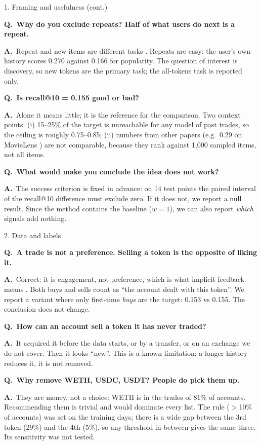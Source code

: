 \documentclass[aspectratio=169,10pt]{beamer}
\newcommand{\Q}[1]{\par{\color{orange}\bfseries Q.\ #1}\par\smallskip}
\newcommand{\A}{{\color{teal}\bfseries A.}\ }
\newcommand{\toindex}{\hfill\hyperlink{index}{\beamerreturnbutton{index}}}
\newcommand{\qsep}{\par\medskip{\color{grey!40}\hrule}\medskip}
\begin{document}
\begin{frame}{1. Framing and usefulness (cont.) \toindex}
  \footnotesize
  \Q{Why do you exclude repeats? Half of what users do next is a repeat.}
  \A Repeat and new items are different tasks \cite{li2021}. Repeats are easy: the user's own history scores 0.270 against 0.166 for popularity. The question of interest is discovery, so new tokens are the primary task; the all-tokens task is reported only.
  \qsep
  \Q{Is recall@10 = 0.155 good or bad?}
  \A Alone it means little; it is the reference for the comparison. Two context points: (i) 15--25\% of the target is unreachable for any model of past trades, so the ceiling is roughly 0.75--0.85; (ii) numbers from other papers (e.g.\ 0.29 on MovieLens \cite{cremonesi2010}) are not comparable, because they rank against 1{,}000 sampled items, not all items.
  \qsep
  \Q{What would make you conclude the idea does not work?}
  \A The success criterion is fixed in advance: on 14 test points the paired interval of the recall@10 difference must exclude zero. If it does not, we report a null result. Since the method contains the baseline ($w=1$), we can also report \emph{which} signals add nothing.
\end{frame}

\begin{frame}[label=qdata]{2. Data and labels \toindex}
  \footnotesize
  \Q{A trade is not a preference. Selling a token is the opposite of liking it.}
  \A Correct: it is engagement, not preference, which is what implicit feedback means \cite{hu2008}. Both buys and sells count as ``the account dealt with this token''. We report a variant where only first-time \emph{buys} are the target: 0.153 vs 0.155. The conclusion does not change.
  \qsep
  \Q{How can an account sell a token it has never traded?}
  \A It acquired it before the data starts, or by a transfer, or on an exchange we do not cover. Then it looks ``new''. This is a known limitation; a longer history reduces it, it is not removed.
  \qsep
  \Q{Why remove WETH, USDC, USDT? People do pick them up.}
  \A They are money, not a choice: WETH is in the trades of 81\% of accounts. Recommending them is trivial and would dominate every list. The rule ($>$10\% of accounts) was set on the training days; there is a wide gap between the 3rd token (29\%) and the 4th (5\%), so any threshold in between gives the same three. Its sensitivity was not tested.
\end{frame}
\end{document}
